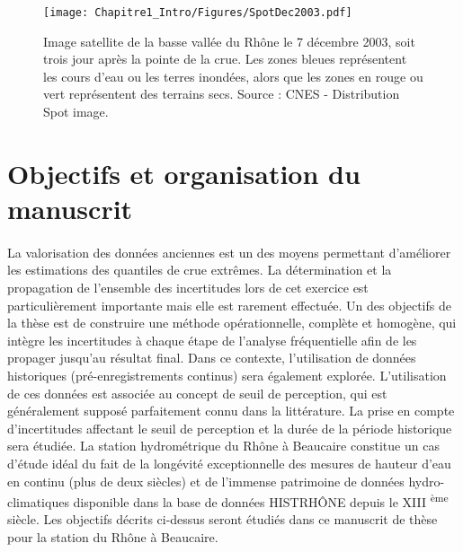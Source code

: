 \begin{figure}[h]
	\centering
	\texttt{[image: Chapitre1\_Intro/Figures/SpotDec2003.pdf]}	
	\caption{Image satellite de la basse vallée du Rhône le 7 décembre 2003, soit trois jour après la pointe de la crue. Les zones bleues représentent les cours d'eau ou les terres inondées, alors que les zones en rouge ou vert représentent des terrains secs. Source : CNES - Distribution Spot image.}
	\label{fig:Spot}
\end{figure}

\FloatBarrier
	\section{Objectifs et organisation du manuscrit}
	
%

	\paragraph{} La valorisation des données anciennes est un des moyens permettant d'améliorer les estimations des quantiles de crue extrêmes. La détermination et la propagation de l'ensemble des incertitudes lors de cet exercice est particulièrement importante mais elle est rarement effectuée. Un des objectifs de la thèse est de construire une méthode opérationnelle, complète et homogène, qui intègre les incertitudes à chaque étape de l'analyse fréquentielle afin de les propager jusqu'au résultat final. Dans ce contexte, l'utilisation de données historiques (pré-enregistrements continus) sera également explorée. L'utilisation de ces données est associée au concept de seuil de perception, qui est généralement supposé parfaitement connu dans la littérature. La prise en compte d'incertitudes affectant le seuil de perception et la durée de la période historique sera étudiée. La station hydrométrique du Rhône à Beaucaire constitue un cas d'étude idéal du fait de la longévité exceptionnelle des mesures de hauteur d'eau en continu (plus de deux siècles) et de l'immense patrimoine de données hydro-climatiques disponible dans la base de données HISTRHÔNE depuis le XIII \textsuperscript{ème} siècle. Les objectifs décrits ci-dessus seront étudiés dans ce manuscrit de thèse pour la station du Rhône à Beaucaire.
	
